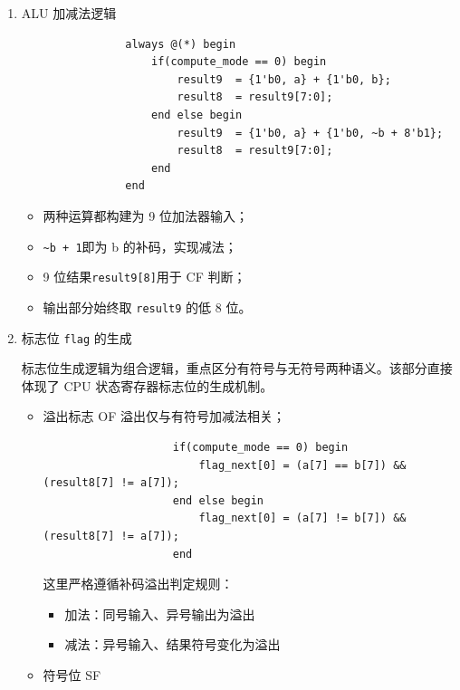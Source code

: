 \documentclass{SYSUReport}
\begin{document}
\begin{enumerate}[label={\chinese*、},labelsep=0pt]
\begin{enumerate}[label = \arabic*、]
\begin{enumerate}[label = （\arabic*）、]
            \item ALU 加减法逻辑
            
            \begin{verbatim}
                always @(*) begin
                    if(compute_mode == 0) begin
                        result9  = {1'b0, a} + {1'b0, b};   
                        result8  = result9[7:0];            
                    end else begin
                        result9  = {1'b0, a} + {1'b0, ~b + 8'b1};
                        result8  = result9[7:0];
                    end
                end
            \end{verbatim}
            \begin{itemize}[leftmargin=0pt]
                \item 两种运算都构建为 9 位加法器输入；
                \item \verb|~b + 1|即为 b 的补码，实现减法；
                \item 9 位结果\verb|result9[8]|用于 CF 判断；
                \item 输出部分始终取 \verb|result9| 的低 8 位。
            \end{itemize}
            \item 标志位 \verb|flag| 的生成
            
            标志位生成逻辑为组合逻辑，重点区分有符号与无符号两种语义。该部分直接体现了 CPU 状态寄存器标志位的生成机制。
            \begin{itemize}
                \item 溢出标志 OF 
                溢出仅与有符号加减法相关；
                \begin{verbatim}
                    if(compute_mode == 0) begin
                        flag_next[0] = (a[7] == b[7]) && (result8[7] != a[7]);
                    end else begin
                        flag_next[0] = (a[7] != b[7]) && (result8[7] != a[7]);
                    end
                \end{verbatim}
                这里严格遵循补码溢出判定规则：
                \begin{itemize}
                    \item  加法：同号输入、异号输出为溢出
                    \item  减法：异号输入、结果符号变化为溢出
                \end{itemize}

                \item 符号位 SF
                

\end{itemize}
\end{enumerate}
\end{enumerate}
\end{enumerate}
\end{document}
